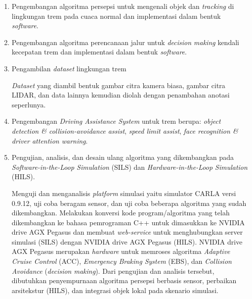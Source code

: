 \begin{enumerate}

    \item Pengembangan algoritma persepsi untuk mengenali objek dan
    \textit{tracking} di lingkungan trem pada cuaca normal dan implementasi
    dalam bentuk \textit{software}.


    \item Pengembangan algoritma perencanaan jalur untuk \textit{decision
    making} kendali kecepatan trem dan implementasi dalam bentuk
    \textit{software}.


    \item Pengambilan \textit{dataset} lingkungan trem

    \textit{Dataset} yang diambil bentuk gambar citra kamera biasa, gambar citra
    LIDAR, dan data lainnya kemudian diolah dengan penambahan anotasi
    seperlunya.

    \item Pengembangan \textit{Driving Assistance System} untuk trem berupa:
    \textit{object detection & collision-avoidance assist},
    \textit{speed limit assist}, \textit{face recognition & driver
    attention warning}.

    \item Pengujian, analisis, dan desain ulang algoritma yang dikembangkan pada
    \textit{Software-in-the-Loop Simulation} (SILS) dan
    \textit{Hardware-in-the-Loop Simulation} (HILS).

    Menguji dan menganalisis \textit{platform} simulasi yaitu simulator CARLA
    versi 0.9.12, uji coba beragam sensor, dan uji coba beberapa algoritma yang
    sudah dikembangkan. Melakukan konversi kode program/algoritma yang telah
    dikembangkan ke bahasa pemrograman C++ untuk dimasukkan ke NVIDIA drive AGX
    Pegasus dan membuat \textit{web-service} untuk menghubungkan server simulasi
    (SILS) dengan NVIDIA drive AGX Pegasus (HILS). NVIDIA drive AGX Pegasus
    merupakan \textit{hardware} untuk memroses algoritma \textit{Adaptive Cruise
    Control} (ACC), \textit{Emergency Braking System} (EBS), dan
    \textit{Collision Avoidance} (\textit{decision making}). Dari pengujian dan
    analisis tersebut, dibutuhkan penyempurnaan algoritma persepsi berbasis
    sensor, perbaikan arsitekstur (HILS), dan integrasi objek lokal pada
    skenario simulasi.


\end{enumerate}
